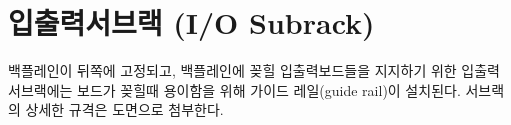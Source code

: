 \section{입출력서브랙 (I/O Subrack)}
백플레인이 뒤쪽에 고정되고, 백플레인에 꽂힐 입출력보드들을 지지하기 위한 입출력서브랙에는
보드가 꽂힐때 용이함을 위해 가이드 레일(guide rail)이 설치된다.
서브랙의 상세한 규격은 도면으로 첨부한다.
%
